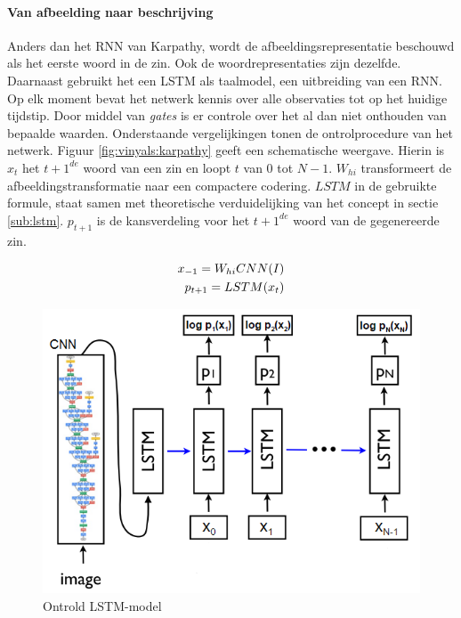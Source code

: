 \paragraph{Van afbeelding naar beschrijving}
Anders dan het RNN van Karpathy, wordt de afbeeldingsrepresentatie beschouwd als het eerste woord in de zin. Ook de woordrepresentaties zijn dezelfde. Daarnaast gebruikt het een LSTM als taalmodel, een uitbreiding van een RNN. Op elk moment bevat het netwerk kennis over alle observaties tot op het huidige tijdstip. Door middel van \emph{gates} is er controle over het al dan niet onthouden van bepaalde waarden. Onderstaande vergelijkingen tonen de ontrolprocedure van het netwerk. Figuur \ref{fig:vinyals:karpathy} geeft een schematische weergave. Hierin is $x_t$ het $t+1^{de}$ woord van een zin en loopt $t$ van $0$ tot $N-1$. $W_{hi}$ transformeert de afbeeldingstransformatie naar een compactere codering. $LSTM$ in de gebruikte formule, staat samen met theoretische verduidelijking van het concept in sectie \ref{sub:lstm}. $p_{t+1}$ is de kansverdeling voor het $t+1^{de}$ woord van de gegenereerde zin.

\begin{eqnarray}
\vspace{-3mm}
x_{-1} = W_{hi}CNN(I)\\
p_{t+1} = LSTM(x_t)
\end{eqnarray}

\begin{figure}[tb]
	\centering
	\includegraphics[width=1\linewidth]{Images/vinyals_karpathy.PNG}
	\caption{Ontrold LSTM-model}
	\label{fig:vinyals:karpthy}
\end{figure}

